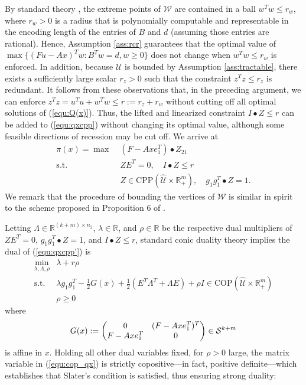 \documentclass[12pt]{article}
\DeclareMathOperator{\st}{s.t.}
\newcommand{\U}{{\mathcal{U}}}
\newcommand{\W}{{\mathcal{W}}}
\newcommand{\K}{\widehat{\mathcal{U}}}
\newcommand{\CP}{{\mathrm{CPP}}}
\newcommand{\COP}{{\mathrm{COP}}}
\newcommand{\p}{\pi}
\def\RR{{\mathbb{R}}}
\newcommand{\Q}{{\K \times \RR^m_+}}
\begin{document}
\begin{onehalfspace}
By standard theory \cite[corollary 3.2d]{Schrijver.1986}, the extreme
points of $\W$ are contained in a ball $w^T w \le r_w$, where $r_w
> 0$ is a radius that is polynomially computable and representable
in the encoding length of the entries of $B$ and $d$ (assuming those
entries are rational). Hence, Assumption \ref{ass:rcr} guarantees that
the optimal value of $\max\{ (Fu - Ax)^T w : B^T w = d, w \ge 0 \}$
does not change when $w^T w \le r_w$ is enforced. In addition, because
$\U$ is bounded by Assumption \ref{ass:tractable}, there exists a
sufficiently large scalar $r_z > 0$ such that the constraint $z^T z
\le r_z$ is redundant. It follows from these observations that, in the
preceding argument, we can enforce $z^T z = u^T u + w^T w \le r := r_z +
r_w$ without cutting off all optimal solutions of (\ref{equ:Q(x)}).
Thus, the lifted and linearized constraint $I \bullet Z \le r$ can be
added to (\ref{equ:qxcpp}) without changing its optimal value, although
some feasible directions of recession may be cut off. We arrive at
\begin{align} \label{equ:qxcpp'}
    \p(x) = \max \; & (F - Axe_1^T) \bullet Z_{21} \\
\st \; \; & ZE^T = 0, \quad I \bullet Z \le r \nonumber \\
     & Z \in \CP(\Q), \quad g_1 g_1^T \bullet Z = 1. \nonumber
\end{align}
We remark that the procedure of bounding the vertices of $\W$
is similar in spirit to the scheme proposed in Proposition 6 of
\cite{Ardestani-Jaafari.Delage.2016}. 

Letting $\Lambda \in \RR^{(k + m) \times n_2}$, $\lambda \in \RR$,
and $\rho \in \RR$ be the respective dual multipliers of $ZE^T = 0$,
$g_1 g_1^T \bullet Z = 1$, and $I \bullet Z \le r$, standard
conic duality theory implies the dual of (\ref{equ:qxcpp'}) is
%
\begin{equation} \label{equ:cop_qx}
\begin{array}{ll}
\min \limits_{\lambda, \Lambda, \rho} & \lambda + r \rho \\
\st &  \lambda g_1 g_1^T - \tfrac12 G(x) + \tfrac12(E^T \Lambda^T + \Lambda E)
+ \rho I \in \COP(\Q) \\
& \rho \ge 0
\end{array}
\end{equation}
where
\[
    G(x) :=
    \begin{pmatrix}
        0 & (F - Axe_1^T)^T \\
             F - Axe_1^T & 0 
    \end{pmatrix}
    \in {\cal S}^{k + m}
\]
is affine in $x$. Holding all other dual variables fixed, for $\rho
> 0$ large, the matrix variable in (\ref{equ:cop_qx}) is strictly
copositive---in fact, positive definite---which establishes that
Slater's condition is satisfied, thus ensuring strong duality:


\end{onehalfspace}
\end{document}
